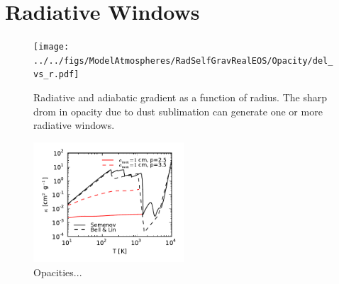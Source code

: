 \documentclass[apj]{emulateapj}
\begin{document}
\section{Radiative Windows} \label{radwindow}

\begin{figure}[h!]
\centering
\texttt{[image: ../../figs/ModelAtmospheres/RadSelfGravRealEOS/Opacity/del\_vs\_r.pdf]}
\caption{Radiative and adiabatic gradient as a function of radius. The sharp drom in opacity due to dust sublimation can generate one or more radiative windows.}
\label{fig:delvsr}
\end{figure}

\begin{figure}[h!]
\centering
\includegraphics[width=0.5\textwidth]{../../figs/ModelAtmospheres/RadSelfGravRealEOS/PaperFigs/kappa_grain_growth_SBL_paper.pdf}
\caption{Opacities...}
\label{fig:opacity}
\end{figure}
\end{document}
